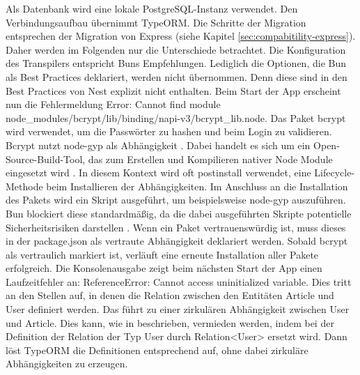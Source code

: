 \noindent
Als Datenbank wird eine lokale PostgreSQL-Instanz verwendet. Den Verbindungsaufbau übernimmt TypeORM. Die Schritte der Migration entsprechen der Migration von Express (siehe Kapitel \ref{sec:compabitility-express}). Daher werden im Folgenden nur die Unterschiede betrachtet. Die Konfiguration des Transpilers entspricht Buns Empfehlungen. Lediglich die Optionen, die Bun als Best Practices deklariert, werden nicht übernommen. Denn diese sind in den Best Practices von Nest explizit nicht enthalten. \newline
Beim Start der App erscheint nun die Fehlermeldung \glq Error: Cannot find module node\_modules/bcrypt/lib/binding/napi-v3/bcrypt\_lib.node\grq{}. Das Paket \glq bcrypt\grq{} wird verwendet, um die Passwörter zu hashen und beim Login zu validieren. \glq Bcrypt\grq{} nutzt \glq node-gyp\grq{} als Abhängigkeit \cite{DelGobbo.2018}. Dabei handelt es sich um ein Open-Source-Build-Tool, das zum Erstellen und Kompilieren nativer Node Module eingesetzt wird \cite{OpenJSFoundation.o.J.c}. In diesem Kontext wird oft \glq postinstall\grq{} verwendet, eine Lifecycle-Methode beim Installieren der Abhängigkeiten. Im Anschluss an die Installation des Pakets wird ein Skript ausgeführt, um beispielsweise \glq node-gyp\grq{} auszuführen. Bun blockiert diese standardmäßig, da die dabei ausgeführten Skripte potentielle Sicherheitsrisiken darstellen \cite{OvenSh.2023}. Wenn ein Paket vertrauenswürdig ist, muss dieses in der \glq package.json\grq{} als vertraute Abhängigkeit deklariert werden. Sobald \glq bcrypt\grq{} als vertraulich markiert ist, verläuft eine erneute Installation aller Pakete erfolgreich.\newline
Die Konsolenausgabe zeigt beim nächsten Start der App einen Laufzeitfehler an: \glq ReferenceError: Cannot access uninitialized variable\grq{}. Dies tritt an den Stellen auf, in denen die Relation zwischen den Entitäten \glq Article\grq{} und \glq User\grq{} definiert werden. Das führt zu einer zirkulären Abhängigkeit zwischen \glq User\grq{} und \glq Article\grq{}. Dies kann, wie in \cite{TypeORM.} beschrieben, vermieden werden, indem bei der Definition der Relation der Typ \glq User\grq{} durch \glq Relation<User>\grq{} ersetzt wird. Dann löst TypeORM die Definitionen entsprechend auf, ohne dabei zirkuläre Abhängigkeiten zu erzeugen.\\

